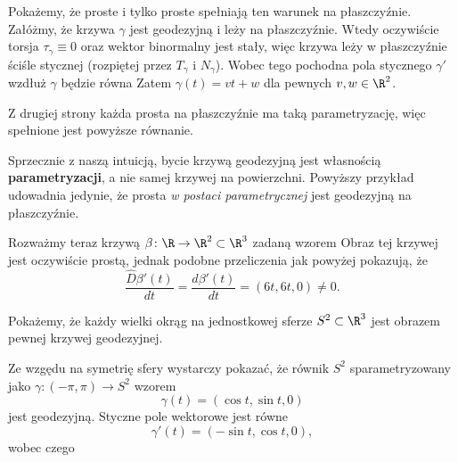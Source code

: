 \begin{frame}

\begin{przyklad} 
Pokażemy, że proste i tylko proste spełniają ten warunek na płaszczyźnie. \pause Załóżmy, że krzywa $\gamma$ jest geodezyjną i leży na płaszczyźnie. Wtedy oczywiście torsja $\tau_\gamma\equiv0$ oraz wektor binormalny jest stały, więc krzywa leży w płaszczyźnie ściśle stycznej (rozpiętej przez $T_\gamma$ i $N_\gamma$). \pause Wobec tego pochodna pola stycznego $\gamma'$ wzdłuż $\gamma$ będzie równa
Zatem $\gamma(t)=vt+w$ dla pewnych $v,w\in \R^2$.

\pause Z drugiej strony każda prosta na płaszczyźnie ma taką parametryzację, więc spełnione jest powyższe równanie.
\end{przyklad}

\end{frame}
\begin{frame}

\begin{uwaga}
Sprzecznie z naszą intuicją, bycie krzywą geodezyjną jest własnością \textbf{parametryzacji}, a nie samej krzywej na powierzchni. Powyższy przykład udowadnia jedynie, że prosta \textit{w postaci parametrycznej} jest geodezyjną na płaszczyźnie. \pause 

\bigskip
Rozważmy teraz krzywą $\beta\colon \R\to \R^2\subset \R^3$ zadaną wzorem
 Obraz tej krzywej jest oczywiście prostą, jednak podobne przeliczenia jak powyżej pokazują, że \[\frac{\widehat{D}\beta'(t)}{dt}=\frac{d\beta'(t)}{dt}=(6t,6t,0)\neq 0.\]
\end{uwaga}

\end{frame}
\begin{frame}
Pokażemy, że każdy wielki okrąg na jednostkowej sferze $S^2\subset \R^3$ jest obrazem pewnej krzywej geodezyjnej. 

Ze wzgędu na symetrię sfery wystarczy pokazać, że równik $S^2$ sparametryzowany jako $\gamma\colon (-\pi,\pi)\to S^2$ wzorem \[\gamma(t)=(\cos t,\sin t,0)\] jest geodezyjną. \pause Styczne pole wektorowe jest równe \[\gamma'(t)=(-\sin t, \cos t, 0),\] wobec czego

\end{frame}
